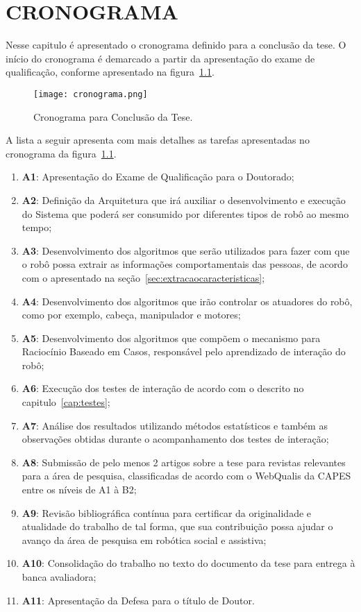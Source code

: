\chapter{CRONOGRAMA}
\label{cap:cronograma}
Nesse capitulo é apresentado o cronograma definido para a conclusão da tese. O início do cronograma é demarcado a partir da apresentação do exame de qualificação, conforme apresentado na figura~\ref{fig:cronograma}.

\begin{figure}[ht!]
	\centering
	\texttt{[image: cronograma.png]}
	\caption{Cronograma para Conclusão da Tese.}
	\label{fig:cronograma}
\end{figure}

A lista a seguir apresenta com mais detalhes as tarefas apresentadas no cronograma da figura~\ref{fig:cronograma}.

\begin{enumerate}
	\item \textbf{A1}: Apresentação do Exame de Qualificação para o Doutorado;
	\item \textbf{A2}: Definição da Arquitetura que irá auxiliar o desenvolvimento e execução do Sistema que poderá ser consumido por diferentes tipos de robô ao mesmo tempo;
	\item \textbf{A3}: Desenvolvimento dos algoritmos que serão utilizados para fazer com que o robô possa extrair as informações comportamentais das pessoas, de acordo com o apresentado na seção~\ref{sec:extracaocaracteristicas};
	\item \textbf{A4}: Desenvolvimento dos algoritmos que irão controlar os atuadores do robô, como por exemplo, cabeça, manipulador e motores;
	\item \textbf{A5}: Desenvolvimento dos algoritmos que compõem o mecanismo para Raciocínio Baseado em Casos, responsável pelo aprendizado de interação do robô;
	\item \textbf{A6}: Execução dos testes de interação de acordo com o descrito no capitulo~\ref{cap:testes};
	\item \textbf{A7}: Análise dos resultados utilizando métodos estatísticos e também as observações obtidas durante o acompanhamento dos testes de interação;
	\item \textbf{A8}: Submissão de pelo menos 2 artigos sobre a tese para revistas relevantes para a área de pesquisa, classificadas de acordo com o WebQualis da CAPES entre os níveis de A1 à B2;
	\item \textbf{A9}: Revisão bibliográfica contínua para certificar da originalidade e atualidade do trabalho de tal forma, que sua contribuição possa ajudar o avanço da área de pesquisa em robótica social e assistiva;
	\item \textbf{A10}: Consolidação do trabalho no texto do documento da tese para entrega à banca avaliadora;
	\item \textbf{A11}: Apresentação da Defesa para o título de Doutor.
\end{enumerate}
